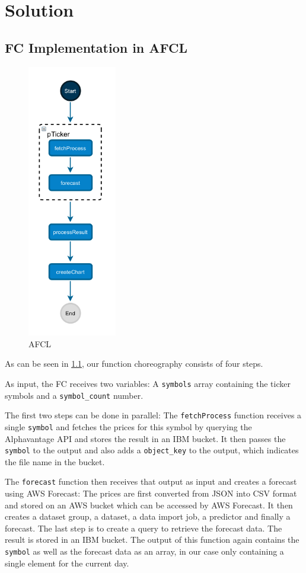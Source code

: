 \chapter{\label{chap:solution}Solution}


%
%
%
\section{FC Implementation in AFCL}


\begin{figure}[h]
  \centering
  \includegraphics[height=12cm, keepaspectratio]{./assets/afcl}
  \caption{AFCL}
  \label{fig:afcl}
\end{figure}

As can be seen in \cref{fig:afcl}, our function choreography consists of
four steps.

As input, the FC receives two variables: A \texttt{symbols} array containing
the ticker symbols and a \texttt{symbol\_count} number.

The first two steps can be done in parallel: The \texttt{fetchProcess} function
receives a single \texttt{symbol} and fetches the prices for this symbol by
querying the Alphavantage API and stores the result in an IBM bucket. It then
passes the \texttt{symbol} to the output and also adds a \texttt{object\_key}
to the output, which indicates the file name in the bucket.

The \texttt{forecast} function then receives that output as input and creates a
forecast using AWS Forecast: The prices are first converted from JSON into CSV format
and stored on an AWS bucket which can be accessed by AWS Forecast. It then creates
a dataset group, a dataset, a data import job, a predictor and finally a forecast.
The last step is to create a query to retrieve the forecast data. The result is
stored in an IBM bucket. The output of this function again contains the \texttt{symbol}
as well as the forecast data as an array, in our case only containing a single
element for the current day.

